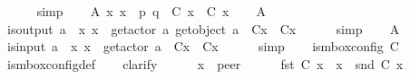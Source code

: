 \begin{isabellebody}
\ \ \ \ \isamarkupfalse%
\ simp\isanewline
\ \ \isamarkupfalse%
\ A{}{\isacharcolon}{\kern0pt}\ {\isachardoublequoteopen}{\isasymforall}x{\isachardot}{\kern0pt}\ x\ {\isasymnotin}\ {\isacharbraceleft}{\kern0pt}p{\isacharcomma}{\kern0pt}\ q{\isacharbraceright}{\kern0pt}\ {\isasymlongrightarrow}\ C{}\ x\ {\isacharequal}{\kern0pt}\ C{}\ x{\isachardoublequoteclose}\isanewline
\ \ \isamarkupfalse%
\ A{}\ \isamarkupfalse%
\ {\isachardoublequoteopen}is{\isacharunderscore}{\kern0pt}output\ a\ {\isasymLongrightarrow}\ {\isasymforall}x{\isachardot}{\kern0pt}\ x\ {\isasymnotin}\ {\isacharbraceleft}{\kern0pt}get{\isacharunderscore}{\kern0pt}actor\ a{\isacharcomma}{\kern0pt}\ get{\isacharunderscore}{\kern0pt}object\ a{\isacharbraceright}{\kern0pt}\ {\isasymlongrightarrow}\ C{}{\isacharparenleft}{\kern0pt}x{\isacharparenright}{\kern0pt}\ {\isacharequal}{\kern0pt}\ C{}{\isacharparenleft}{\kern0pt}x{\isacharparenright}{\kern0pt}{\isachardoublequoteclose}\isanewline
\ \ \ \ \isamarkupfalse%
\ simp\isanewline
\ \ \isamarkupfalse%
\ A{}\ \isamarkupfalse%
\ {\isachardoublequoteopen}is{\isacharunderscore}{\kern0pt}input\ a\ {\isasymLongrightarrow}\ {\isasymforall}x{\isachardot}{\kern0pt}\ x\ {\isasymnoteq}\ get{\isacharunderscore}{\kern0pt}actor\ a\ {\isasymlongrightarrow}\ C{}{\isacharparenleft}{\kern0pt}x{\isacharparenright}{\kern0pt}\ {\isacharequal}{\kern0pt}\ C{}{\isacharparenleft}{\kern0pt}x{\isacharparenright}{\kern0pt}{\isachardoublequoteclose}\isanewline
\ \ \ \ \isamarkupfalse%
\ simp\isanewline
\ \ \isamarkupfalse%
\ {\isachardoublequoteopen}is{\isacharunderscore}{\kern0pt}mbox{\isacharunderscore}{\kern0pt}config\ C{}{\isachardoublequoteclose}\isanewline
\ \ \ \ \isamarkupfalse%
\ is{\isacharunderscore}{\kern0pt}mbox{\isacharunderscore}{\kern0pt}config{\isacharunderscore}{\kern0pt}def\isanewline
\ \ \isamarkupfalse%
\ clarify\isanewline
\ \ \ \ \isamarkupfalse%
\ x\ {\isacharcolon}{\kern0pt}{\isacharcolon}{\kern0pt}\ {\isachardoublequoteopen}{\isacharprime}{\kern0pt}peer{\isachardoublequoteclose}\isanewline
\ \ \ \ \isamarkupfalse%
\ {\isachardoublequoteopen}fst\ {\isacharparenleft}{\kern0pt}C{}\ x{\isacharparenright}{\kern0pt}\ {\isasymin}\ {\isasymS}{\isacharparenleft}{\kern0pt}x{\isacharparenright}{\kern0pt}\ {\isasymand}\ snd\ {\isacharparenleft}{\kern0pt}C{}\ x{\isacharparenright}{\kern0pt}\ {\isasymin}\ {\isasymM}\isactrlsup {\isacharasterisk}{\kern0pt}{\isachardoublequoteclose}\isanewline

\end{isabellebody}
